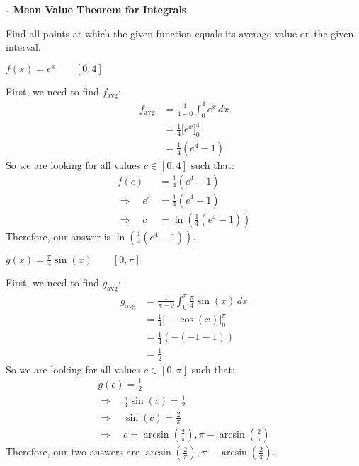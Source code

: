 \documentclass[nooutcomes]{ximera}
\renewcommand{\d}{\,d}
\newcommand{\dfn}{\textbf}
\newcommand{\eval}[1]{\bigg[ #1 \bigg]}
\renewenvironment{freeResponse}{
\ifhandout\setbox0\vbox\bgroup\else
\begin{trivlist}\item[\hskip \labelsep\bfseries Solution:\hspace{2ex}]
\fi}
{\ifhandout\egroup\else
\end{trivlist}
\fi}
\begin{document}
	
	
	
	
	
	
	
			
			

\begin{problem}
\dfn{- Mean Value Theorem for Integrals}

Find all points at which the given function equals its average value on the given interval.
	\begin{enumerate}
	
	\item  $f(x) = e^x	\qquad	[0,4]$
		\begin{freeResponse}
		First, we need to find $f_{\text{avg}}$:
			\begin{align*}
			f_{\text{avg}} &= \frac{1}{4-0} \int_0^4 e^x \d x  \\
			&= \frac{1}{4} \eval{e^x}_0^4  \\
			&= \frac{1}{4} \left( e^4 - 1 \right)  
			\end{align*}
		So we are looking for all values $c \in [0,4]$ such that:
			\begin{align*}
			f(c) &= \frac{1}{4} (e^4 - 1)  \\
			\Longrightarrow \quad e^c &= \frac{1}{4} (e^4 - 1)  \\
			\Longrightarrow \quad c &= \ln \left( \frac{1}{4} (e^4 - 1) \right)
			\end{align*}
		Therefore, our answer is $\ln \left( \frac{1}{4} (e^4 - 1) \right)$.
		\end{freeResponse}
		
		
		
	\item  $g(x) = \frac{\pi}{4} \sin(x)	\qquad	[0,\pi]$
		\begin{freeResponse}
		First, we need to find $g_{\text{avg}}$:
			\begin{align*}
			g_{\text{avg}} &= \frac{1}{\pi-0} \int_0^{\pi} \frac{\pi}{4} \sin(x) \d x  \\
			&= \frac{1}{4} \eval{-\cos(x)}_0^{\pi}  \\
			&= \frac{1}{4} \left( - (-1-1) \right)  \\
			&= \frac{1}{2}
			\end{align*}
		So we are looking for all values $c \in [0,\pi]$ such that:
			\begin{align*}
			&g(c) = \frac{1}{2}  \\
			&\Longrightarrow \quad \frac{\pi}{4} \sin(c) = \frac{1}{2}  \\
			&\Longrightarrow \quad \sin(c) = \frac{2}{\pi}  \\
			&\Longrightarrow \quad c = \arcsin \left( \frac{2}{\pi} \right), \pi - \arcsin \left( \frac{2}{\pi} \right)
			&\end{align*}
		Therefore, our two answers are $\arcsin \left( \frac{2}{\pi} \right), \pi - \arcsin \left( \frac{2}{\pi} \right)$.
		\end{freeResponse}
		
		
		
	\end{enumerate}
			
			
		
\end{problem}
\end{document}
